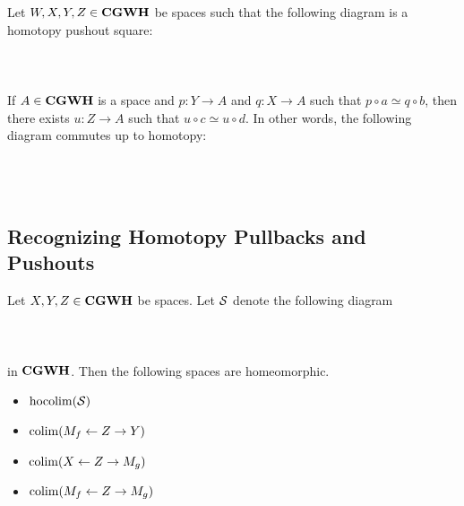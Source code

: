 \documentclass[a4paper]{article}
\begin{document}
\begin{prp}{}{} Let $W,X,Y,Z\in\bold{CGWH}$ be spaces such that the following diagram is a homotopy pushout square: \\~\\
\\~\\
If $A\in\bold{CGWH}$ is a space and $p:Y\to A$ and $q:X\to A$ such that $p\circ a\simeq q\circ b$, then there exists $u:Z\to A$ such that $u\circ c\simeq u\circ d$. In other words, the following diagram commutes up to homotopy: \\~\\
\\~\\
\end{prp}

\subsection{Recognizing Homotopy Pullbacks and Pushouts}
\begin{prp}{}{} Let $X,Y,Z\in\bold{CGWH}$ be spaces. Let $\mathcal{S}$ denote the following diagram \\~\\
\\~\\
in $\bold{CGWH}$. Then the following spaces are homeomorphic. 
\begin{itemize}
\item $\operatorname*{hocolim}(\mathcal{S})$
\item $\operatorname*{colim}(M_f\leftarrow Z\rightarrow Y)$
\item $\operatorname*{colim}(X\leftarrow Z\rightarrow M_g)$
\item $\operatorname*{colim}(M_f\leftarrow Z\rightarrow M_g)$
\end{itemize}
\end{prp}
\end{document}
